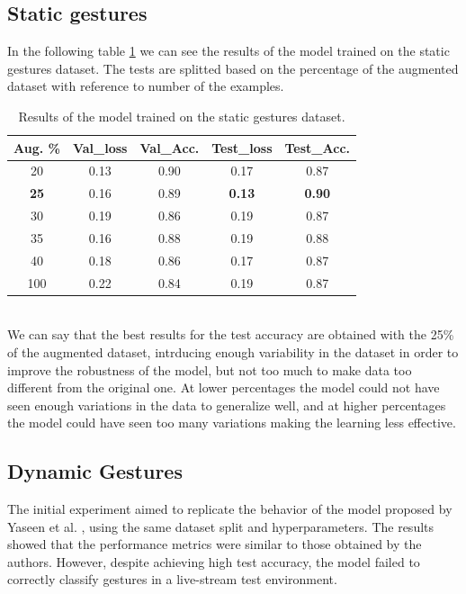 \documentclass[10pt,twocolumn,letterpaper]{article}
\begin{document}
\subsection{Static gestures}
In the following table \ref{tab:staticGestures} we can see the results of the model 
trained on the static gestures dataset. 
The tests are splitted based on the percentage of the augmented dataset with reference to number of the examples.
\begin{table}[h]
   \begin{center}
   \begin{tabular}{|c|c|c|c|c|}
   \hline
   \textbf{Aug. \%} & \textbf{Val\_loss} & \textbf{Val\_Acc.} & \textbf{Test\_loss} & \textbf{Test\_Acc.}\\
   \hline\hline
   20 & 0.13 & 0.90 & 0.17 & 0.87 \\
   \textbf{25} & 0.16 & 0.89 & \textbf{0.13} & \textbf{0.90} \\
   30 & 0.19 & 0.86 & 0.19 & 0.87 \\
   35 & 0.16 & 0.88 & 0.19 & 0.88 \\
   40 & 0.18 & 0.86 & 0.17 & 0.87 \\
   100 & 0.22 & 0.84 & 0.19 & 0.87 \\ 
   \hline
   \end{tabular}
   \end{center}
   \caption{Results of the model trained on the static gestures dataset.}
   \label{tab:staticGestures}
\end{table} \\
We can say that the best results for the test accuracy are obtained with the 25\% of the 
augmented dataset, intrducing enough variability in the dataset in order to 
improve the robustness of the model, but not too much to make data too different from the original one.
At lower percentages the model could not have seen enough variations in the data to generalize well, and at 
higher percentages the model could have seen too many variations making the learning less effective.
\subsection{Dynamic Gestures}
The initial experiment aimed to replicate the behavior of the model proposed by Yaseen et al. \cite{electronics13163233}, using the same dataset split and hyperparameters.  
The results showed that the performance metrics were similar to those obtained by the authors. 
However, despite achieving high test accuracy, the model failed to correctly classify gestures 
in a live-stream test environment.  
\end{document}
